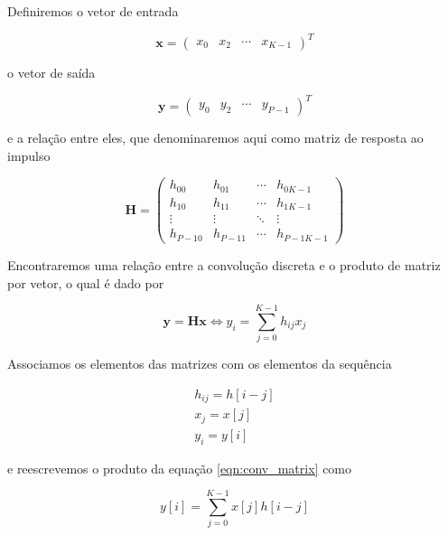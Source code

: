 \documentclass[x11names,a4paper,12pt]{article}
\begin{document}
Definiremos o vetor de entrada

\begin{equation}
  \mathbf{x}=
  \begin{pmatrix}
    x_0 & x_2 & \cdots & x_{K-1}
  \end{pmatrix}^T
\end{equation}

o vetor de saída

\begin{equation}
  \mathbf{y}=
  \begin{pmatrix}
    y_0 & y_2 & \cdots & y_{P-1}
  \end{pmatrix}^T
\end{equation}

e a relação entre eles, que denominaremos aqui como matriz de resposta ao impulso

\begin{equation}
  \mathbf{H}=
  \begin{pmatrix}
    h_{00} & h_{01} & \cdots & h_{0{K-1}} \\
    h_{10} & h_{11} & \cdots & h_{1{K-1}} \\
    \vdots & \vdots & \ddots & \vdots \\
    h_{{P-1}0} & h_{{P-1}1} & \cdots & h_{{P-1}{K-1}}
  \end{pmatrix}
\end{equation}

Encontraremos uma relação entre a convolução discreta e o produto de matriz por vetor, o qual é dado por

\begin{equation}
  \mathbf{y}=\mathbf{H}\mathbf{x} \Leftrightarrow y_{i}=\sum_{j=0}^{K-1} h_{ij} x_{j}
  \label{eqn:conv_matrix}
\end{equation}

Associamos os elementos das matrizes com os elementos da sequência

\begin{equation}
  \begin{gathered}
    h_{ij} = h[i-j] \\
    x_{j}  = x[j] \\
    y_{i}  = y[i]
  \end{gathered}
\end{equation}

e reescrevemos o produto da equação \ref{eqn:conv_matrix} como

\begin{equation}
  y[i]=\sum_{j=0}^{K-1}x[j]h[i-j]
  \label{eq:conv_matrix}
\end{equation}
\end{document}
